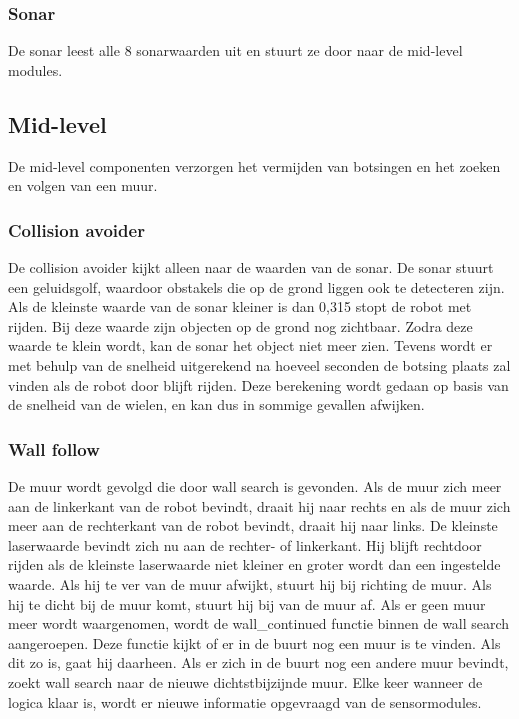 \documentclass[a4paper,10pt]{article}
\begin{document}
\subsubsection{Sonar}
De sonar leest alle 8 sonarwaarden uit en stuurt ze door naar de mid-level modules.

\subsection{Mid-level}
De mid-level componenten verzorgen het vermijden van botsingen en het zoeken en volgen van een muur.

\subsubsection{Collision avoider}
De collision avoider kijkt alleen naar de waarden van de sonar. De sonar stuurt een geluidsgolf, waardoor obstakels die op de grond liggen ook te detecteren zijn. Als de kleinste waarde van de sonar kleiner is dan 0,315 stopt de robot met rijden. Bij deze waarde zijn objecten op de grond nog zichtbaar. Zodra deze waarde te klein wordt, kan de sonar het object niet meer zien. Tevens wordt er met behulp van de snelheid uitgerekend na hoeveel seconden de botsing plaats zal vinden als de robot door blijft rijden. Deze berekening wordt gedaan op basis van de snelheid van de wielen, en kan dus in sommige gevallen afwijken.

\subsubsection{Wall follow}
De muur wordt gevolgd die door wall search is gevonden. Als de muur zich meer aan de linkerkant van de robot bevindt, draait hij naar rechts en als de muur zich meer aan de rechterkant van de robot bevindt, draait hij naar links. De kleinste laserwaarde bevindt zich nu aan de rechter- of linkerkant. Hij blijft rechtdoor rijden als de kleinste laserwaarde niet kleiner en groter wordt dan een ingestelde waarde. Als hij te ver van de muur afwijkt, stuurt hij bij richting de muur. Als hij te dicht bij de muur komt, stuurt hij bij van de muur af. Als er geen muur meer wordt waargenomen, wordt de wall\_continued functie binnen de wall search aangeroepen. Deze functie kijkt of er in de buurt nog een muur is te vinden. Als dit zo is, gaat hij daarheen. Als er zich in de buurt nog een andere muur bevindt, zoekt wall search naar de nieuwe dichtstbijzijnde muur. Elke keer wanneer de logica klaar is, wordt er nieuwe informatie opgevraagd van de sensormodules.
\end{document}

